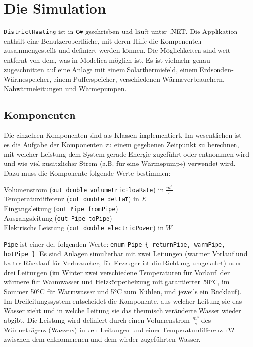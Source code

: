 \documentclass[12pt,a4paper]{article}
\begin{document}
\section{Die Simulation}
\texttt{DistrictHeating} ist in \texttt{C\#} geschrieben und läuft unter .NET. Die Applikation enthält eine Benutzeroberfläche, mit deren Hilfe die Komponenten zusammengestellt und definiert werden können. Die Möglichkeiten sind weit entfernt von dem, was in Modelica möglich ist. Es ist vielmehr genau zugeschnitten auf eine Anlage mit einem Solarthermiefeld, einem Erdsonden-Wärmespeicher, einem Pufferspeicher, verschiedenen Wärmeverbrauchern, Nahwärmeleitungen
und Wärmepumpen.
\subsection{Komponenten} Die einzelnen Komponenten sind als Klassen implementiert. Im wesentlichen ist es die Aufgabe der Komponenten zu einem gegebenen Zeitpunkt zu berechnen, mit welcher Leistung dem System gerade Energie zugeführt oder entnommen wird und wie viel zusätzlicher Strom (z.B. für eine Wärmepumpe) verwendet wird. Dazu muss die Komponente folgende Werte bestimmen:
\begin{description}
\item[Volumenstrom (\texttt{out double volumetricFlowRate}) in $\frac{m^3}{s}$]
\item[Temperaturdifferenz (\texttt{out double deltaT}) in $K$]
\item[Eingangsleitung (\texttt{out Pipe fromPipe})]
\item[Ausgangsleitung (\texttt{out Pipe toPipe})]
\item[Elektrische Leistung (\texttt{out double electricPower}) in $W$]
\end{description}
\texttt{Pipe} ist einer der folgenden Werte: \texttt{enum Pipe \{ returnPipe, warmPipe, hotPipe \}}.
Es sind Anlagen simulierbar mit zwei Leitungen (warmer Vorlauf und kalter Rücklauf für Verbraucher, für Erzeuger ist die Richtung umgekehrt) oder drei Leitungen (im Winter zwei verschiedene Temperaturen für Vorlauf, der wärmere für Warmwasser und Heizkörperheizung mit garantierten 50°C, im Sommer 50°C für Warmwasser und 5°C zum Kühlen, und jeweils ein Rücklauf). Im Dreileitungssystem entscheidet die Komponente, aus welcher Leitung sie das Wasser zieht und in welche Leitung sie das thermisch veränderte Wasser wieder abgibt.
Die Leistung wird definiert durch einen Volumenstrom $\frac{m^3}{s}$ des Wärmeträgers (Wassers) in den Leitungen und einer Temperaturdifferenz $\Delta T$ zwischen dem entnommenen und dem wieder zugeführten Wasser.
\end{document}
